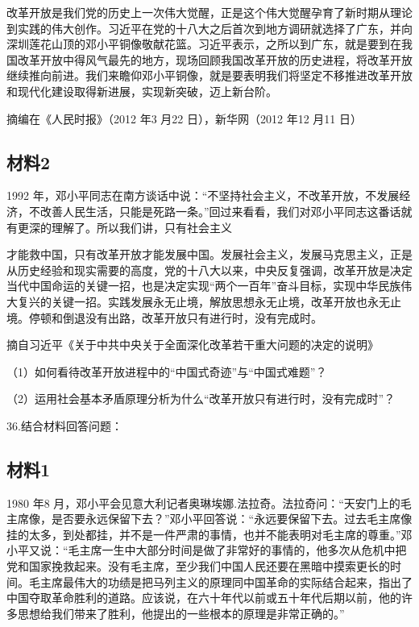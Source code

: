 \documentclass[UTF8,11pt]{ctexart}
\begin{document}
改革开放是我们党的历史上一次伟大觉醒，正是这个伟大觉醒孕育了新时期从理论到实践的伟大创作。习近平在党的十八大之后首次到地方调研就选择了广东，并向深圳莲花山顶的邓小平铜像敬献花篮。习近平表示，之所以到广东，就是要到在我国改革开放中得风气最先的地方，现场回顾我国改革开放的历史进程，将改革开放继续推向前进。我们来瞻仰邓小平铜像，就是要表明我们将坚定不移推进改革开放和现代化建设取得新进展，实现新突破，迈上新台阶。

摘编在《人民时报》（2012 年3 月22 日），新华网（2012 年12 月11 日）

\subsection*{材料2}

1992 年，邓小平同志在南方谈话中说：“不坚持社会主义，不改革开放，不发展经济，不改善人民生活，只能是死路一条。”回过来看看，我们对邓小平同志这番话就有更深的理解了。所以我们讲，只有社会主义


才能救中国，只有改革开放才能发展中国。发展社会主义，发展马克思主义，正是从历史经验和现实需要的高度，党的十八大以来，中央反复强调，改革开放是决定当代中国命运的关键一招，也是决定实现“两个一百年”奋斗目标，实现中华民族伟大复兴的关键一招。实践发展永无止境，解放思想永无止境，改革开放也永无止境。停顿和倒退没有出路，改革开放只有进行时，没有完成时。

摘自习近平《关于中共中央关于全面深化改革若干重大问题的决定的说明》

（1）如何看待改革开放进程中的“中国式奇迹”与“中国式难题”？


（2）运用社会基本矛盾原理分析为什么“改革开放只有进行时，没有完成时”？


36.结合材料回答问题：


\subsection*{材料1}

1980 年8 月，邓小平会见意大利记者奥琳埃娜.法拉奇。法拉奇问：“天安门上的毛主席像，是否要永远保留下去？”邓小平回答说：“永远要保留下去。过去毛主席像挂的太多，到处都挂，并不是一件严肃的事情，也并不能表明对毛主席的尊重。”邓小平又说：“毛主席一生中大部分时间是做了非常好的事情的，他多次从危机中把党和国家挽救起来。没有毛主席，至少我们中国人民还要在黑暗中摸索更长的时间。毛主席最伟大的功绩是把马列主义的原理同中国革命的实际结合起来，指出了中国夺取革命胜利的道路。应该说，在六十年代以前或五十年代后期以前，他的许多思想给我们带来了胜利，他提出的一些根本的原理是非常正确的。”
\end{document}
